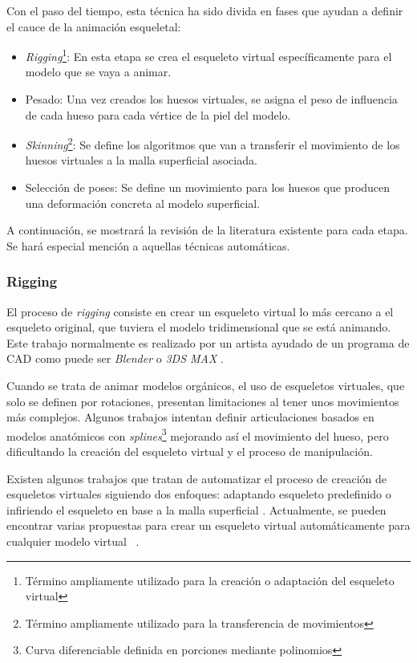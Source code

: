 Con el paso del tiempo, esta técnica ha sido divida en fases que ayudan a definir el cauce de la animación esqueletal:

\begin{itemize}
    \item \emph{Rigging}\footnote{Término ampliamente utilizado para la creación o adaptación del esqueleto virtual}: En esta etapa se crea el esqueleto virtual específicamente para el modelo que se vaya a animar.
    \item Pesado: Una vez creados los huesos virtuales, se asigna el peso de influencia de cada hueso para cada vértice de la piel del modelo.
    \item \emph{Skinning}\footnote{Término ampliamente utilizado  para la transferencia de movimientos}: Se define los algoritmos que van a transferir el movimiento de los huesos virtuales a la malla superficial asociada. 
    \item Selección de poses: Se define un movimiento para los huesos que producen una deformación concreta al modelo superficial.
\end{itemize}

A continuación, se mostrará la revisión de la literatura existente para cada etapa. Se hará especial mención a aquellas técnicas automáticas.
\subsubsection{Rigging}
\label{art:rigging}

El proceso de \emph{rigging} consiste en crear un esqueleto virtual lo más cercano a el esqueleto original, que tuviera el modelo tridimensional que se está animando. Este trabajo normalmente es realizado por un artista ayudado de un programa de \ac{CAD} como puede ser \emph{Blender} \cite{blender} o \emph{3DS MAX} \cite{3ds}. 

Cuando se trata de animar modelos orgánicos, el uso de esqueletos virtuales, que solo se definen por rotaciones, presentan limitaciones al tener unos movimientos más complejos. Algunos trabajos intentan definir articulaciones basados en modelos anatómicos \cite{joints} con \emph{splines}\footnote{ Curva diferenciable definida en porciones mediante polinomios} mejorando así el movimiento del hueso, pero dificultando la creación del esqueleto virtual y el proceso de manipulación.

Existen algunos trabajos que tratan de automatizar el proceso de creación de esqueletos virtuales siguiendo dos enfoques: adaptando esqueleto predefinido \cite{huang2013robust} o infiriendo el esqueleto en base a la malla superficial \cite{jacobson2014part}.
Actualmente, se pueden encontrar varias propuestas para crear un esqueleto virtual automáticamente para cualquier modelo virtual ~\cite{borosan2012rigmesh,feng2014fast,avril2016animation}.





